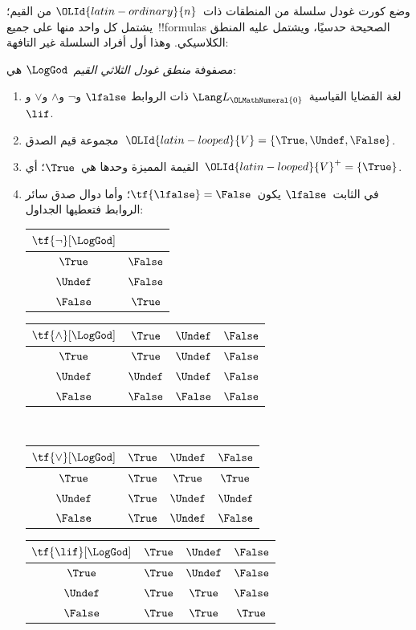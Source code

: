 \documentclass[../../../include/open-logic-section]{subfiles}
\begin{document}


وضع كورت غودل سلسلة من المنطقات ذات~$\OLId{latin-ordinary}{n}$ من القيم؛ يشتمل كل واحد
منها على جميع~!!{formula}s الصحيحة حدسيًا، ويشتمل عليه المنطق
الكلاسيكي. وهذا أول أفراد السلسلة غير التافهة:

\begin{defn}
مصفوفة \emph{منطق غودل الثلاثي القيم}~$\LogGod$ هي:
\begin{enumerate}
  \item لغة القضايا القياسية~$\Lang L_\OLMathNumeral{0}$ ذات الروابط
  $\lfalse$ و$\lnot$ و$\land$ و$\lor$ و$\lif$.
  \item مجموعة قيم الصدق~$\OLId{latin-looped}{V} = \{\True, \Undef, \False\}$.
  \item القيمة المميزة وحدها هي~$\True$؛ أي~$\OLId{latin-looped}{V}^+ = \{\True\}$.
  \item في الثابت~$\lfalse$ يكون~$\tf{\lfalse} = \False$؛ وأما
  دوال صدق سائر الروابط فتعطيها الجداول:
  \begin{center}
    \begin{tabular}{c|c}
      $\tf{\lnot}[\LogGod]$ & \\
      \hline
      $\True$ & $\False$ \\
      $\Undef$ & $\False$ \\
      $\False$ & $\True$
    \end{tabular}
    \quad
    \begin{tabular}{c|ccc}
      $\tf{\land}[\LogGod]$ & $\True$ & $\Undef$ & $\False$ \\
      \hline
      $\True$ & $\True$ & $\Undef$ & $\False$ \\
      $\Undef$ & $\Undef$ & $\Undef$ & $\False$\\
      $\False$ & $\False$ & $\False$ & $\False$
    \end{tabular}
    \\[2ex]
    \begin{tabular}{c|ccc}
      $\tf{\lor}[\LogGod]$ & $\True$ & $\Undef$ & $\False$ \\
      \hline
      $\True$ & $\True$ & $\True$ & $\True$ \\
      $\Undef$ & $\True$ & $\Undef$ & $\Undef$ \\
      $\False$ & $\True$ & $\Undef$ & $\False$
    \end{tabular}
    \quad
    \begin{tabular}{c|ccc}
      $\tf{\lif}[\LogGod]$ & $\True$ & $\Undef$ & $\False$ \\
      \hline
      $\True$ & $\True$ & $\Undef$ & $\False$ \\
      $\Undef$ & $\True$ & $\True$ & $\False$  \\
      $\False$ & $\True$ & $\True$ & $\True$
    \end{tabular}
  \end{center}
\end{enumerate}
\end{defn}
\end{document}
